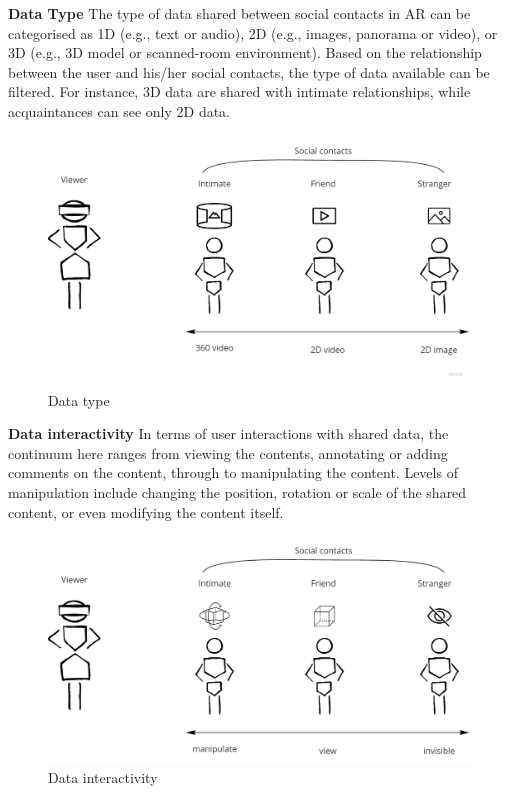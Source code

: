 \textbf{Data Type}
The type of data shared between social contacts in AR can be categorised as 1D (e.g., text or audio), 2D (e.g., images, panorama or video), or 3D (e.g., 3D model or scanned-room environment). Based on the relationship between the user and his/her social contacts, the type of data available can be filtered. For instance, 3D data are shared with intimate relationships, while acquaintances can see only 2D data.  

\begin{figure}[h]
    \centering
    \includegraphics[width=.8\linewidth]{images/Continuum-Data-type.jpg}
    \caption{Data type}
    \label{fig:continuum:data-type}
\end{figure}

\textbf{Data interactivity}
In terms of user interactions with shared data, the continuum here ranges from viewing the contents, annotating or adding comments on the content, through to manipulating the content. Levels of manipulation include changing the position, rotation or scale of the shared content, or even modifying the content itself.

\begin{figure}[h]
    \centering
    \includegraphics[width=.8\linewidth]{images/Continuum-interaction.jpg}
    \caption{Data interactivity}
    \label{fig:continuum:data-interaction}
\end{figure}

